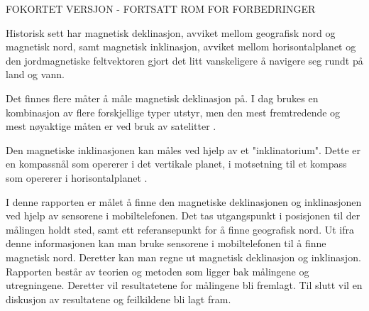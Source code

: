 FOKORTET VERSJON - FORTSATT ROM FOR FORBEDRINGER \newline

Historisk sett har magnetisk deklinasjon, avviket mellom geografisk nord og magnetisk nord, samt magnetisk inklinasjon, avviket mellom horisontalplanet og den jordmagnetiske feltvektoren gjort det litt vanskeligere å navigere seg rundt på land og vann.

Det finnes flere måter å måle magnetisk deklinasjon på. I dag brukes en kombinasjon av flere forskjellige typer utstyr, men den mest fremtredende og mest nøyaktige måten er ved bruk av satelitter \cite{World_magnetic_model}.

Den magnetiske inklinasjonen kan måles ved hjelp av et "inklinatorium". Dette er en kompassnål som opererer i det vertikale planet, i motsetning til et kompass som opererer i horisontalplanet \cite{inklinometer}.

I denne rapporten er målet å finne den magnetiske deklinasjonen og inklinasjonen ved hjelp av sensorene i mobiltelefonen. Det tas utgangspunkt i posisjonen til der målingen holdt sted, samt ett referansepunkt for å finne geografisk nord. Ut ifra denne informasjonen kan man bruke sensorene i mobiltelefonen til å finne magnetisk nord. Deretter kan man regne ut magnetisk deklinasjon og inklinasjon. Rapporten består av teorien og metoden som ligger bak målingene og utregningene. Deretter vil resultatetene for målingene bli fremlagt. Til slutt vil en diskusjon av resultatene og feilkildene bli lagt fram.